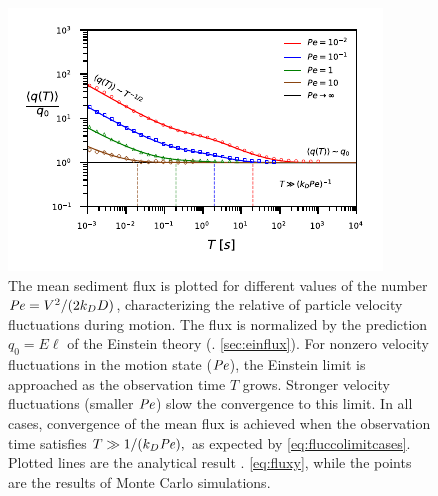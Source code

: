 \begin{figure}[!htbp]
	\includegraphics[width=\linewidth,keepaspectratio]{figures/ch2/figure3_slopeKey.pdf}
	\caption{The mean sediment flux is plotted for different values of the \DIFdelbeginFL {}\DIFdelendFL \DIFaddbeginFL {}\DIFaddendFL number $\mbox{\textit{Pe}} = V^2/(2k_D D)$, characterizing the relative \DIFdelbeginFL {}\DIFdelendFL \DIFaddbeginFL {}\DIFaddendFL of particle velocity fluctuations during motion. The flux is normalized by the prediction $q_0 = E \ell$ of the Einstein theory (\DIFdelbeginFL {}\DIFdelendFL \DIFaddbeginFL {}\DIFaddendFL . \ref{sec:einflux}). For nonzero velocity fluctuations in the motion state (\DIFdelbeginFL {}\DIFdelendFL \DIFaddbeginFL {}\DIFaddendFL $\mbox{\textit{Pe}}$), the Einstein limit is approached as the observation time $T$ grows. Stronger velocity fluctuations (smaller $\mbox{\textit{Pe}}$) slow the convergence to this limit.
	In all cases, \DIFdelbeginFL {}\DIFdelendFL convergence of the mean flux is achieved when the observation time satisfies $T\gg 1/(k_D \mbox{\textit{Pe}}),$ as expected by \DIFdelbeginFL {}\DIFdelendFL \DIFaddbeginFL {}\DIFaddendFL \ref{eq:fluccolimitcases}. Plotted lines are the analytical result \DIFdelbeginFL {}\DIFdelendFL \DIFaddbeginFL {}\DIFaddendFL . \ref{eq:fluxy}, while the points are the results of Monte Carlo simulations. \DIFaddbeginFL {}\DIFaddendFL }
	\label{fig:fluxconvergence}
\end{figure}

